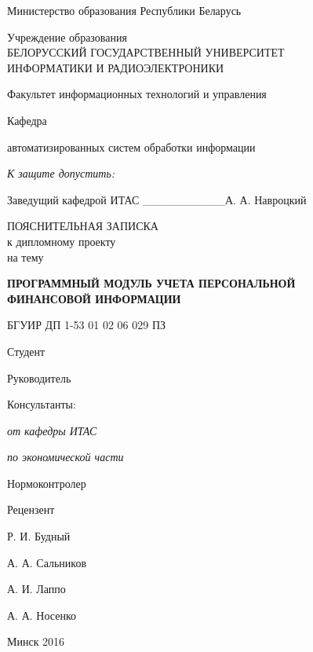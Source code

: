 \thispagestyle{empty}
\setlength{\parindent}{0ex} %

{\centering{}
  Министерство образования Республики Беларусь\par
}

\bigskip
{\centering{}
  Учреждение образования \\
  БЕЛОРУССКИЙ ГОСУДАРСТВЕННЫЙ УНИВЕРСИТЕТ \\
  ИНФОРМАТИКИ И РАДИОЭЛЕКТРОНИКИ\par
}

\bigskip
Факультет
информационных технологий и управления

\smallskip
\parbox{\widthof{Факультет}}{Кафедра}
автоматизированных систем обработки информации

\vspace{\baselineskip}
\hfill
\begin{minipage}{.4\textwidth}
  {\raggedright{}
    \textit{К защите допустить:}

    \smallskip
    Заведущий кафедрой ИТАС
    \_\_\_\_\_\_\_\_\_\_А. А. Навроцкий\par
  }
\end{minipage}

\vspace{2\baselineskip}

{\centering{}
  ПОЯСНИТЕЛЬНАЯ ЗАПИСКА \\
  к дипломному проекту \\
  на тему\par
}

\bigskip
{\centering{}
  \textbf{ПРОГРАММНЫЙ МОДУЛЬ УЧЕТА ПЕРСОНАЛЬНОЙ \\ ФИНАНСОВОЙ ИНФОРМАЦИИ}\par
}

\bigskip
{\centering{}
  БГУИР ДП 1-53 01 02 06 029 ПЗ\par
}

\vspace{\baselineskip}

\begin{minipage}{.6\textwidth}
Студент

Руководитель

Консультанты:

\hspace{0.3em} \textit{от кафедры ИТАС}

\hspace{0.3em} \textit{по экономической части}

Нормоконтролер

\smallskip
Рецензент
\end{minipage}
\hfill
\begin{minipage}{.3\textwidth}
  Р. И. Будный

  А. А. Сальников

  \vspace{\baselineskip}
  А. И. Лаппо

  А. А. Носенко

  \color{red}{???}

  \smallskip
  \color{red}{???}
\end{minipage}

\vfill

{\centering{}
  Минск 2016\par
}

\setlength{\parindent}{1.25cm} %
